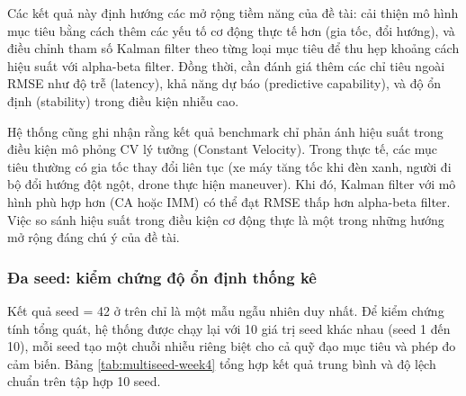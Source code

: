 Các kết quả này định hướng các mở rộng tiềm năng của đề tài: cải thiện mô hình mục tiêu bằng cách thêm các yếu tố cơ động thực tế hơn (gia tốc, đổi hướng), và điều chỉnh tham số Kalman filter theo từng loại mục tiêu để thu hẹp khoảng cách hiệu suất với alpha-beta filter. Đồng thời, cần đánh giá thêm các chỉ tiêu ngoài RMSE như độ trễ (latency), khả năng dự báo (predictive capability), và độ ổn định (stability) trong điều kiện nhiễu cao.

Hệ thống cũng ghi nhận rằng kết quả benchmark chỉ phản ánh hiệu suất trong điều kiện mô phỏng CV lý tưởng (Constant Velocity). Trong thực tế, các mục tiêu thường có gia tốc thay đổi liên tục (xe máy tăng tốc khi đèn xanh, người đi bộ đổi hướng đột ngột, drone thực hiện maneuver). Khi đó, Kalman filter với mô hình phù hợp hơn (CA hoặc IMM) có thể đạt RMSE thấp hơn alpha-beta filter. Việc so sánh hiệu suất trong điều kiện cơ động thực là một trong những hướng mở rộng đáng chú ý của đề tài.

\subsubsection{Đa seed: kiểm chứng độ ổn định thống kê}

\hspace{0.5cm} Kết quả seed = 42 ở trên chỉ là một mẫu ngẫu nhiên duy nhất. Để kiểm chứng tính tổng quát, hệ thống được chạy lại với 10 giá trị seed khác nhau (seed 1 đến 10), mỗi seed tạo một chuỗi nhiễu riêng biệt cho cả quỹ đạo mục tiêu và phép đo cảm biến. Bảng \ref{tab:multiseed-week4} tổng hợp kết quả trung bình và độ lệch chuẩn trên tập hợp 10 seed.

\begin{table}[H]
\centering
\caption{Kết quả đa seed: trung bình ± độ lệch chuẩn trên 10 seed (120 giây, 10 Hz, ranh giới 400 m)}
\label{tab:multiseed-week4}
\end{table}

